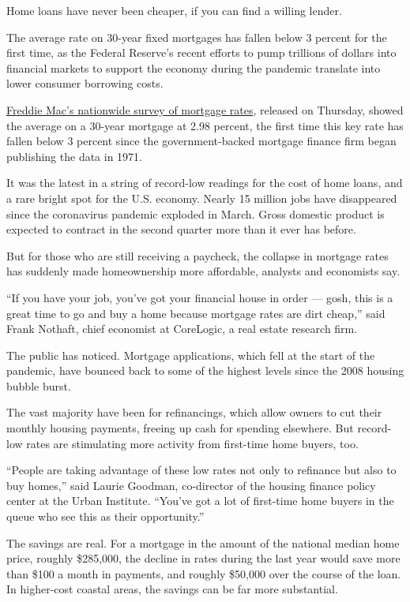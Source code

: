 Home loans have never been cheaper, if you can find a willing lender.

The average rate on 30-year fixed mortgages has fallen below 3 percent
for the first time, as the Federal Reserve's recent efforts to pump
trillions of dollars into financial markets to support the economy
during the pandemic translate into lower consumer borrowing costs.

\href{http://www.freddiemac.com/pmms/\#}{Freddie Mac's nationwide survey
of mortgage rates}, released on Thursday, showed the average on a
30-year mortgage at 2.98 percent, the first time this key rate has
fallen below 3 percent since the government-backed mortgage finance firm
began publishing the data in 1971.

It was the latest in a string of record-low readings for the cost of
home loans, and a rare bright spot for the U.S. economy. Nearly 15
million jobs have disappeared since the coronavirus pandemic exploded in
March. Gross domestic product is expected to contract in the second
quarter more than it ever has before.

But for those who are still receiving a paycheck, the collapse in
mortgage rates has suddenly made homeownership more affordable, analysts
and economists say.

``If you have your job, you've got your financial house in order ---
gosh, this is a great time to go and buy a home because mortgage rates
are dirt cheap,'' said Frank Nothaft, chief economist at CoreLogic, a
real estate research firm.

The public has noticed. Mortgage applications, which fell at the start
of the pandemic, have bounced back to some of the highest levels since
the 2008 housing bubble burst.

The vast majority have been for refinancings, which allow owners to cut
their monthly housing payments, freeing up cash for spending elsewhere.
But record-low rates are stimulating more activity from first-time home
buyers, too.

``People are taking advantage of these low rates not only to refinance
but also to buy homes,'' said Laurie Goodman, co-director of the housing
finance policy center at the Urban Institute. ``You've got a lot of
first-time home buyers in the queue who see this as their opportunity.''

The savings are real. For a mortgage in the amount of the national
median home price, roughly \$285,000, the decline in rates during the
last year would save more than \$100 a month in payments, and roughly
\$50,000 over the course of the loan. In higher-cost coastal areas, the
savings can be far more substantial.

